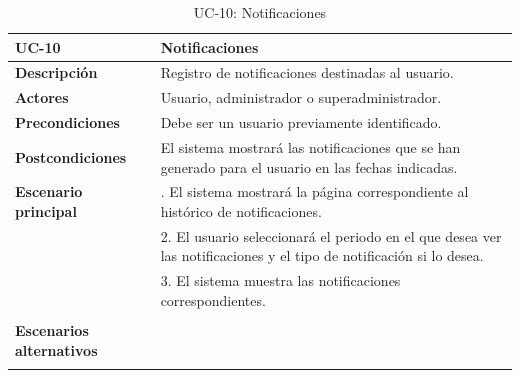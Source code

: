 \begin{table}
  \begin{center}
    \begin{tabularx}{16.4cm}{|l|X|}
      \hline
      \textbf{UC-10} & \textbf{Notificaciones}\\
      \hline
      \textbf{Descripción} & Registro de notificaciones destinadas al usuario.\\
      \hline
      \textbf{Actores} & Usuario, administrador o superadministrador.\\
      \hline
      \textbf{Precondiciones} & Debe ser un usuario previamente identificado.\\
      \hline
      \textbf{Postcondiciones} & El sistema mostrará las notificaciones que se han generado para el usuario en las fechas indicadas.\\
      \hline
      \textbf{Escenario principal} & \smallskip 1. El sistema mostrará la página correspondiente al histórico de notificaciones.\\
      & 2. El usuario seleccionará el periodo en el que desea ver las notificaciones y el tipo de notificación si lo desea.\\
      & 3. El sistema muestra las notificaciones correspondientes.\\
      & \\
      \hline
      \textbf{Escenarios alternativos} & \\
      & \\
      \hline
    \end{tabularx}
    \caption{UC-10: Notificaciones}
    \label{tab:CU-notificaciones}
  \end{center}
\end{table}


